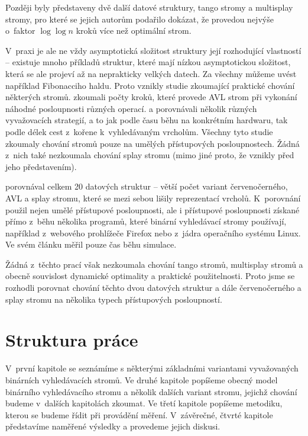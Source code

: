 Později byly představeny dvě další datové struktury, tango stromy a multisplay stromy, pro které se jejich autorům podařilo dokázat, že provedou nejvýše o~faktor $\log\log n$ kroků více než optimální strom.

V~praxi je ale ne vždy asymptotická složitost struktury její rozhodující
vlastností -- existuje mnoho příkladů struktur, které mají nízkou
asymptotickou složitost, která se ale projeví až na neprakticky velkých datech. Za
všechny můžeme uvést například Fibonacciho haldu. Proto vznikly studie
zkoumající praktické chování některých stromů. \citet{AVLperformance} zkoumali
počty kroků, které provede AVL strom při vykonání náhodné
posloupnosti různých operací. \citet{comparison} a \citet{comparison2}
porovnávali několik různých vyvažovacích strategií, a to jak podle času běhu na konkrétním hardwaru, tak
podle délek cest z~kořene k~vyhledávaným vrcholům. Všechny tyto studie zkoumaly
chování stromů pouze na umělých přístupových posloupnostech. Žádná z~nich také
nezkoumala chování splay stromu (mimo jiné proto, že vznikly před jeho představením).


\citet{performance} porovnával celkem 20 datových struktur -- větší počet variant červenočerného, AVL a splay stromu, které se mezi sebou lišily reprezentací vrcholů. K~porovnání použil nejen umělé přístupové posloupnosti, ale i přístupové posloupnosti získané přímo z~běhu několika programů, které binární vyhledávací stromy používají, například z~webového prohlížeče Firefox nebo z~jádra operačního systému Linux. Ve svém článku měřil pouze čas běhu simulace.

Žádná z~těchto prací však nezkoumala chování tango stromů, multisplay stro\-mů a obecně souvislost dynamické optimality a praktické použitelnosti. Proto jsme se rozhodli porovnat chování těchto dvou datových struktur a dále červenočerného a splay stromu na několika typech přístupových posloupností.

\section*{Struktura práce}

V~první kapitole se seznámíme s některými základními variantami vyvažovaných binárních
vyhledávacích stromů. Ve druhé kapitole popíšeme obecný model binárního
vyhledávacího stromu a několik dalších variant stromu, jejichž chování
budeme v~dalších kapitolách zkoumat. Ve třetí kapitole popíšeme metodiku,
kterou se budeme řídit při provádění měření. V~závěrečné, čtvrté kapitole
představíme naměřené výsledky a provedeme jejich diskusi.
